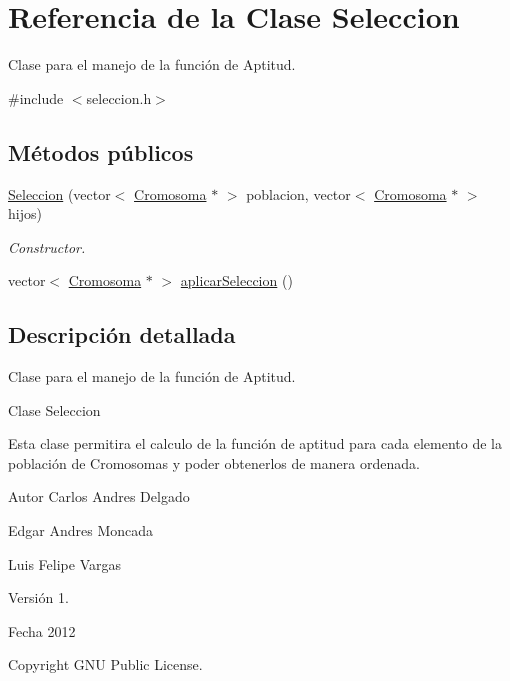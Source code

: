 \hypertarget{classSeleccion}{\section{Referencia de la Clase Seleccion}
\label{classSeleccion}
}


Clase para el manejo de la función de Aptitud.  




{\ttfamily \#include $<$seleccion.\-h$>$}

\subsection*{Métodos públicos}
\begin{DoxyCompactItemize}
\item 
\hyperlink{classSeleccion_acb29238452bae45af7d8f17a40717546}{Seleccion} (vector$<$ \hyperlink{classCromosoma}{Cromosoma} $\ast$ $>$ poblacion, vector$<$ \hyperlink{classCromosoma}{Cromosoma} $\ast$ $>$ hijos)
\begin{DoxyCompactList}\small\item\em Constructor. \end{DoxyCompactList}\item 
vector$<$ \hyperlink{classCromosoma}{Cromosoma} $\ast$ $>$ \hyperlink{classSeleccion_afa43291c3ecb60dbce0370e19fba81e7}{aplicar\-Seleccion} ()
\end{DoxyCompactItemize}


\subsection{Descripción detallada}
Clase para el manejo de la función de Aptitud. 

\begin{DoxyVerb}Clase Seleccion
\end{DoxyVerb}


Esta clase permitira el calculo de la función de aptitud para cada elemento de la población de Cromosomas y poder obtenerlos de manera ordenada. \begin{DoxyAuthor}{Autor}
Carlos Andres Delgado 

Edgar Andres Moncada 

Luis Felipe Vargas 
\end{DoxyAuthor}
\begin{DoxyVersion}{Versión}
1. 
\end{DoxyVersion}
\begin{DoxyDate}{Fecha}
2012 
\end{DoxyDate}
\begin{DoxyCopyright}{Copyright}
G\-N\-U Public License. 
\end{DoxyCopyright}


